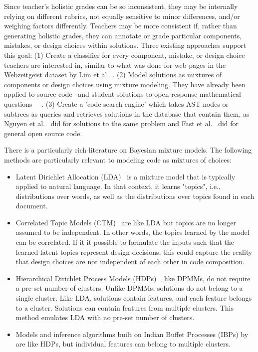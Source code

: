 Since teacher's holistic grades can be so inconsistent, they may be internally relying on different rubrics, not equally sensitive to minor differences, and/or weighing factors differently. Teachers may be more consistent if, rather than generating holistic grades, they can annotate or grade particular components, mistakes, or design choices within solutions. Three existing approaches support this goal: (1) Create a classifier for every component, mistake, or design choice teachers are interested in, similar to what was done for web pages in the Webzeitgeist dataset by Lim et al.~\cite{lim2012learning}. (2) Model solutions as mixtures of components or design choices using mixture modeling. They have already been applied to source code~\cite{} and student solutions to open-response mathematical questions~\cite{} ~\cite{binkley2014understanding,Linstead}. (3) Create a 'code search engine' which takes AST nodes or subtrees as queries and retrieves solutions in the database that contain them, as Nguyen et al.~\cite{codewebs} did for solutions to the same problem and Fast et al.~\cite{codex} did for general open source code.

There is a particularly rich literature on Bayesian mixture models. The following methods are particularly relevant to modeling code as mixtures of choices:
\begin{itemize}
\item Latent Dirichlet Allocation (LDA)~\cite{bleiLDA} is a mixture model that is typically applied to natural language. In that context, it learns "topics", i.e., distributions over words, as well as the distributions over topics found in each document. %
\item Correlated Topic Models (CTM)~\cite{} are like LDA but topics are no longer assumed to be independent. In other words, the topics learned by the model can be correlated. If it it possible to formulate the inputs such that the learned latent topics represent design decisions, this could capture the reality that design choices are not independent of each other in code composition.
\item Hierarchical Dirichlet Process Models (HDPs)~\cite{}, like DPMMs, do not require a pre-set number of clusters. Unlike DPMMs, solutions do not belong to a single cluster. Like LDA, solutions contain features, and each feature belongs to a cluster. Solutions can contain features from multiple clusters. This method emulates LDA with no pre-set number of clusters. 
\item Models and inference algorithms built on Indian Buffet Processes (IBPs) by \citet{doshi2009indian} are like HDPs, but individual features can belong to multiple clusters.
\end{itemize}


